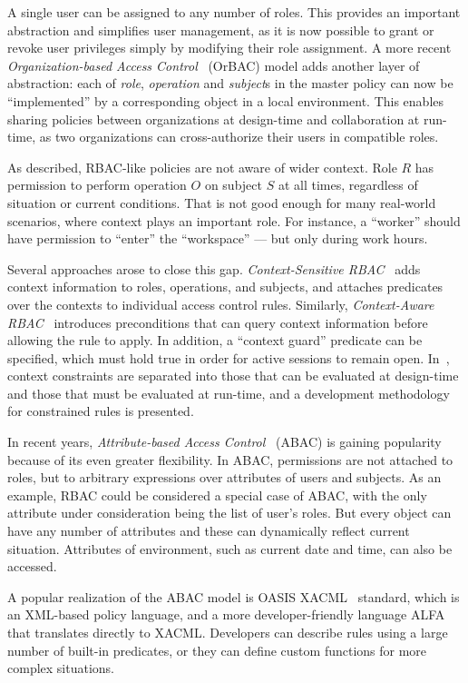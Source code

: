A single user can be assigned to any number of roles. This provides an important
abstraction and simplifies user management, as it is now possible to grant or revoke
user privileges simply by modifying their role assignment. A more recent
\textit{Organization-based Access Control}~\citep{orbac2003} (OrBAC) model adds another
layer of abstraction: each of \textit{role}, \textit{operation} and \textit{subject}s in
the master policy can now be ``implemented'' by a corresponding object in a local
environment. This enables sharing policies between organizations at design-time and
collaboration at run-time, as two organizations can cross-authorize their users in
compatible roles.

As described, RBAC-like policies are not aware of wider context. Role $R$ has permission
to perform operation $O$ on subject $S$ at all times, regardless of situation or current
conditions. That is not good enough for many real-world scenarios, where context plays
an important role. For instance, a ``worker'' should have permission to ``enter'' the
``workspace'' --- but only during work hours.

Several approaches arose to close this gap. \textit{Context-Sensitive
RBAC}~\citep{contextkumar2002} adds context information to roles, operations, and
subjects, and attaches predicates over the contexts to individual access control rules.
Similarly, \textit{Context-Aware RBAC}~\citep{contextkulkarni2008} introduces
preconditions that can query context information before allowing the rule to apply. In
addition, a ``context guard'' predicate can be specified, which must hold true in order
for active sessions to remain open. In~\citep{contextrbac2004}, context constraints are
separated into those that can be evaluated at design-time and those that must be
evaluated at run-time, and a development methodology for constrained rules is presented.

In recent years, \textit{Attribute-based Access Control}~\citep{abac2014} (ABAC) is
gaining popularity because of its even greater flexibility. In ABAC, permissions are not
attached to roles, but to arbitrary expressions over attributes of users and subjects.
As an example, RBAC could be considered a special case of ABAC, with the only attribute
under consideration being the list of user's roles. But every object can have any number
of attributes and these can dynamically reflect current situation. Attributes of
environment, such as current date and time, can also be accessed.

A popular realization of the ABAC model is OASIS XACML~\citep{xacml2013} standard, which
is an XML-based policy language, and a more developer-friendly language
ALFA~\citep{alfa} that translates directly to XACML. Developers can describe rules using
a large number of built-in predicates, or they can define custom functions for more
complex situations.

